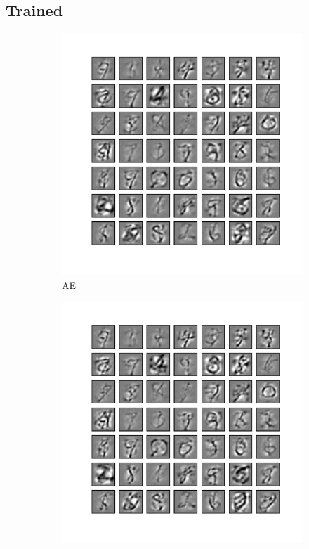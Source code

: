 \subsection{Trained \DIFdelbegin {}\DIFdelend \DIFaddbegin {}\DIFaddend }
\label{subsec:MNIST_weight}
\begin{figure}
	\centering
	\begin{subfigure}[t]{0.4\textwidth}
		\includegraphics[width=\textwidth]{pics_sdlm/22_MNIST_AE/2_60000_0.pdf}
		\caption{AE}
	\end{subfigure}
	\begin{subfigure}[t]{0.4\textwidth}
		\includegraphics[width=\textwidth]{pics_sdlm/23_MNIST_AE_noise/2_60000_0.pdf}

\end{subfigure}
\end{figure}
